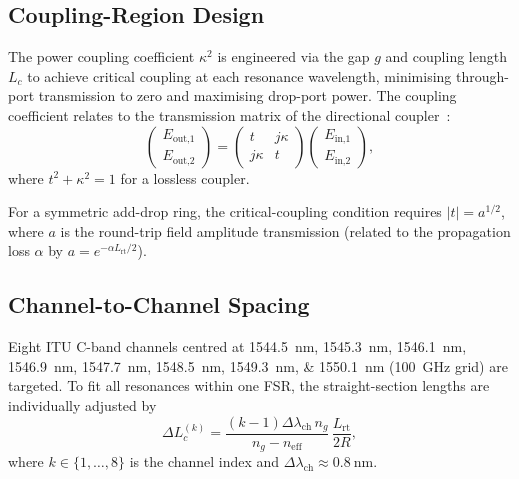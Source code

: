 \subsection{Coupling-Region Design}
The power coupling coefficient $\kappa^2$ is engineered via the gap $g$
and coupling length $L_c$ to achieve critical coupling at each
resonance wavelength, minimising through-port transmission to zero and
maximising drop-port power.  The coupling coefficient relates to the
transmission matrix of the directional coupler~\cite{okamoto2006fundamentals}:
\begin{equation}
  \begin{pmatrix} E_\text{out,1} \\ E_\text{out,2} \end{pmatrix}
  =
  \begin{pmatrix} t & j\kappa \\ j\kappa & t \end{pmatrix}
  \begin{pmatrix} E_\text{in,1} \\ E_\text{in,2} \end{pmatrix},
  \label{eq:coupler}
\end{equation}
where $t^2 + \kappa^2 = 1$ for a lossless coupler.

For a symmetric add-drop ring, the critical-coupling condition requires
$|t| = a^{1/2}$, where $a$ is the round-trip field amplitude transmission
(related to the propagation loss $\alpha$ by $a = e^{-\alpha L_\text{rt}/2}$).

\subsection{Channel-to-Channel Spacing}
Eight ITU C-band channels centred at \SIlist{1544.5; 1545.3; 1546.1;
1546.9; 1547.7; 1548.5; 1549.3; 1550.1}{\nano\meter}
(\SI{100}{\giga\hertz} grid) are targeted.  To fit all resonances within
one FSR, the straight-section lengths are individually adjusted by
\begin{equation}
  \Delta L_c^{(k)} = \frac{(k-1)\Delta\lambda_\text{ch}\,n_g}
                          {n_g - n_\text{eff}}\,\frac{L_\text{rt}}{2R},
  \label{eq:delta_lc}
\end{equation}
where $k \in \{1,\ldots,8\}$ is the channel index and
$\Delta\lambda_\text{ch} \approx \SI{0.8}{\nano\meter}$.
